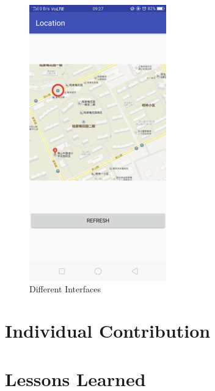 \documentclass{article}
\begin{document}
\begin{figure}[htbp]
\begin{minipage}[t]{0.30\linewidth}
	\end{minipage}
	\begin{minipage}[t]{0.30\linewidth}
		\includegraphics{img/Picture6}
	\end{minipage}	
	\caption{Different Interfaces}
\end{figure}

\section{Individual Contribution}

\section{Lessons Learned}
\end{document}
